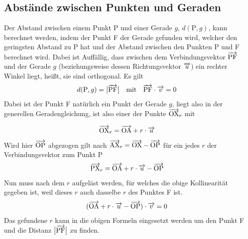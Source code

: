 \documentclass{article}
\begin{document}
\subsection{Abstände zwischen Punkten und Geraden}
\begin{minipage}[t]{\dimexpr\textwidth-5cm}  
Der Abstand zwischen einem Punkt P und einer Gerade $g$, $d(\text{P}, g)$, kann berechnet werden, indem der Punkt F der Gerade gefunden wird, welcher den geringsten Abstand zu P hat und der Abstand zwischen den Punkten P und F berechnet wird.
Dabei ist Auffällig, dass zwischen dem Verbindungsvektor $\overrightarrow{\mathrm{PF}}$ und der Gerade $g$ (beziehungsweise dessen Richtungsvektor $\overrightarrow{u}$) ein rechter Winkel liegt, heißt, sie sind orthogonal. Es gilt
\[
 d(\text{P}, g) = \big| {\overrightarrow{\mathrm{PF}}} \big| \quad \text{mit} \quad \overrightarrow{\mathrm{PF}} \cdot \overrightarrow{v} = 0
\]
Dabei ist der Punkt F natürlich ein Punkt der Gerade $g$, liegt also in der generellen Geradengleichung, ist also einer der Punkte $\overrightarrow{\mathrm{OX}}_r$ mit
\end{minipage}
\hfill
\begin{minipage}[t]{5cm}
 \centering 
\end{minipage} 
\[
 \overrightarrow{\mathrm{OX}}_r = \overrightarrow{\mathrm{OA}} + r \cdot \overrightarrow{u} 
\]
Wird hier $\overrightarrow{\mathrm{OP}}$ abgezogen gilt nach $\overrightarrow{\mathrm{AX}}_r = \overrightarrow{\mathrm{OX}} - \overrightarrow{\mathrm{OP}}$ für ein jedes $r$ der Verbindungsvektor zum Punkt P
\[
 \overrightarrow{\mathrm{PX}}_r = \overrightarrow{\mathrm{OA}} + r \cdot \overrightarrow{u} - \overrightarrow{\mathrm{OP}}
\]
Nun muss nach dem $r$ aufgeläst werden, für welches die obige Kollinearität gegeben ist, weil dieses $r$ auch dasselbe $r$ des Punktes F ist. 
\[
 (\overrightarrow{\mathrm{OA}} + r \cdot \overrightarrow{u} - \overrightarrow{\mathrm{OP}}) \cdot \overrightarrow{v} = 0
\]
Das gefundene $r$ kann in die obigen Formeln eingesetzt werden um den Punkt F und die Distanz $\big| {\overrightarrow{\mathrm{PF}}} \big|$ zu finden.
 
\end{document}
